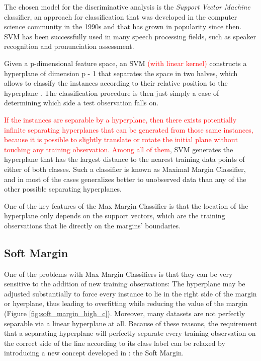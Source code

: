 
The chosen model for the discriminative analysis is the \textit{Support Vector Machine} classifier,
an approach for classification that was developed in the computer science community in the 1990s
and that has grown in popularity since then. SVM has been successfully used in many
speech processing fields, such as speaker recognition and pronunciation assessment.

Given a p-dimensional feature space, an SVM \textcolor{red}{(with linear kernel)}
constructs a hyperplane of dimension p - 1
that separates the space in two halves, which allows to classify the instances according
to their relative position to the hyperplane \cite{svm_jwht}. The classification
procedure is then just simply a case of determining which side a test observation falls on.

\textcolor{red}{
If the instances are separable by a hyperplane, then there exists potentially infinite
separating hyperplanes that can be generated from those same instances, because it
is possible to slightly translate or rotate the initial plane without touching any training
observation. Among all of them}, SVM generates the hyperplane that has the largest
distance to the nearest training data points of either of both classes. Such a classifier
is known as Maximal Margin Classifier, and in most of the cases generalizes better to
unobserved data than any of the other possible separating hyperplanes.

One of the key features of the Max Margin Classifier is that the location of the hyperplane
only depends on the support vectors, which are the training observations that lie directly
on the margins' boundaries.

\subsection{Soft Margin} \label{subsection:soft_margin}

One of the problems with Max Margin Classifiers is that they can be very sensitive to the
addition of new training observations: The hyperplane may be adjusted substantially
to force every instance to lie in the right side of the margin or hyerplane, thus leading
to overfitting while reducing the value of the margin (Figure \ref{fig:soft_margin_high_c}).
Moreover, many datasets are not perfectly separable via a linear hyperplane at all.
Because of these reasons, the requirement that a separating hyperplane will perfectly separate
every training observation on the correct side of the line according to its class label can
be relaxed by introducing a new concept developed in \cite{svm_soft_margin}: the Soft Margin.


